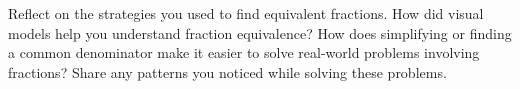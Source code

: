 \documentclass[12pt]{article}
\begin{document}
\begin{tcolorbox}[colframe=black!60, colback=white, 
coltitle=black, colbacktitle=black!15, fonttitle=\bfseries\Large, 
title=Reflection, halign title=center, left=10pt, right=10pt, top=10pt, bottom=80pt]
Reflect on the strategies you used to find equivalent fractions. How did visual models help you understand fraction equivalence? How does simplifying or finding a common denominator make it easier to solve real-world problems involving fractions? Share any patterns you noticed while solving these problems.
\end{tcolorbox}
\end{document}
